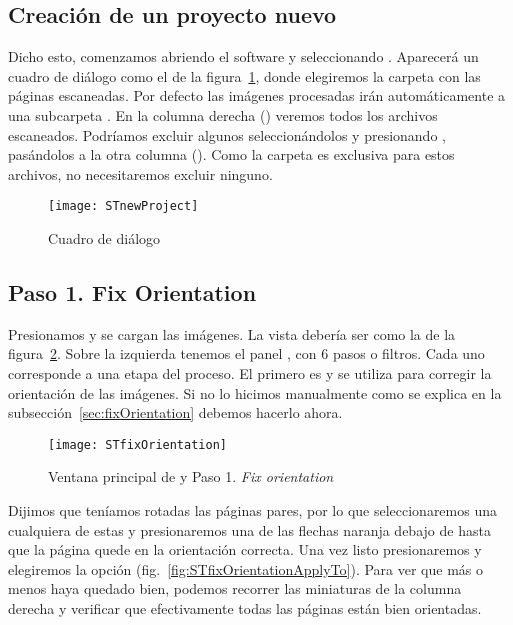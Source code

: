 \documentclass[%
	a5paper,
	10pt,
	twoside,
	openright,
	final,
]{memoir}
\begin{document}
{	\subsection{Creación de un proyecto nuevo} Dicho esto, comenzamos abriendo el software y seleccionando . Aparecerá un cuadro de diálogo como el de la figura~\ref{fig:STnewProject}, donde elegiremos la carpeta con las páginas escaneadas. Por defecto las imágenes procesadas irán automáticamente a una subcarpeta . En la columna derecha () veremos todos los archivos escaneados. Podríamos excluir algunos seleccionándolos y presionando , pasándolos a la otra columna (). Como la carpeta  es exclusiva para estos archivos, no necesitaremos excluir ninguno.

	\begin{figure}
		\centering
		\texttt{[image: STnewProject]}
		\caption[Cuadro de diálogo \texttt{New Project} de \scantailor]{Cuadro de diálogo \label{fig:STnewProject}}
	\end{figure}

	\subsection{Paso 1. Fix Orientation\label{sec:STfixOrientation}} Presionamos  y se cargan las imágenes. La vista debería ser como la de la figura~\ref{fig:STfixOrientation}. Sobre la izquierda tenemos el panel , con 6 pasos o filtros. Cada uno corresponde a una etapa del proceso. El primero es  y se utiliza para corregir la orientación de las imágenes. Si no lo hicimos manualmente como se explica en la subsección~\ref{sec:fixOrientation} debemos hacerlo ahora.

	\begin{figure}
		\centering
		\texttt{[image: STfixOrientation]}
		\caption[Paso 1. \emph{Fix orientation}]{Ventana principal de \scantailor y Paso 1. \emph{Fix orientation}\label{fig:STfixOrientation}}
	\end{figure}

	Dijimos que teníamos rotadas las páginas pares, por lo que seleccionaremos una cualquiera de estas y presionaremos una de las flechas naranja debajo de  hasta que la página quede en la orientación correcta. Una vez listo presionaremos  y elegiremos la opción  (fig.~\ref{fig:STfixOrientationApplyTo}). Para ver que más o menos haya quedado bien, podemos recorrer las miniaturas de la columna derecha y verificar que efectivamente todas las páginas están bien orientadas.

}
\end{document}
